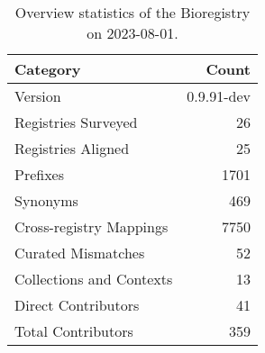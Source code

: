 \begin{table}
\caption{Overview statistics of the Bioregistry on 2023-08-01.}
\label{tab:bioregistry-summary}
\begin{tabular}{lr}
\toprule
Category & Count \\
\midrule
Version & 0.9.91-dev \\
Registries Surveyed & 26 \\
Registries Aligned & 25 \\
Prefixes & 1701 \\
Synonyms & 469 \\
Cross-registry Mappings & 7750 \\
Curated Mismatches & 52 \\
Collections and Contexts & 13 \\
Direct Contributors & 41 \\
Total Contributors & 359 \\
\bottomrule
\end{tabular}
\end{table}
